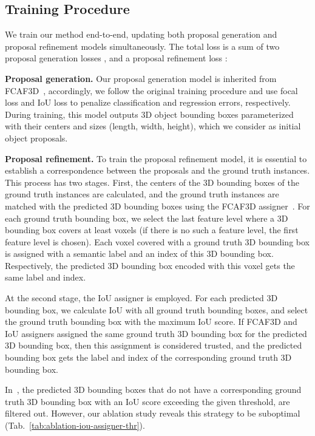 \documentclass[10pt,twocolumn,letterpaper]{article}
\newcommand\inline{\noindent\textbf}
\begin{document}
\subsection{Training Procedure}
\label{ssec:training-procedure}

We train our method end-to-end, updating both proposal generation and proposal refinement models simultaneously. The total loss is a sum of two proposal generation losses ,  and a proposal refinement loss : 

\inline{Proposal generation.} Our proposal generation model is inherited from FCAF3D~\cite{rukhovich2022fcaf3d}, accordingly, we follow the original training procedure and use focal loss  and IoU loss  to penalize classification and regression errors, respectively. During training, this model outputs 3D object bounding boxes parameterized with their centers and sizes (length, width, height), which we consider as initial object proposals.

\inline{Proposal refinement.} 
To train the proposal refinement model, it is essential to establish a correspondence between the proposals and the ground truth instances. This process has two stages. First, the centers of the 3D bounding boxes of the ground truth instances are calculated, and the ground truth instances are matched with the predicted 3D bounding boxes using the FCAF3D assigner~\cite{rukhovich2022fcaf3d}. For each ground truth bounding box, we select the last feature level where a 3D bounding box covers at least  voxels (if there is no such a feature level, the first feature level is chosen). Each voxel covered with a ground truth 3D bounding box is assigned with a semantic label and an index of this 3D bounding box. Respectively, the predicted 3D bounding box encoded with this voxel gets the same label and index.

At the second stage, the IoU assigner is employed. For each predicted 3D bounding box, we calculate IoU with all ground truth bounding boxes, and select the ground truth bounding box with the maximum IoU score. If FCAF3D and IoU assigners assigned the same ground truth 3D bounding box for the predicted 3D bounding box, then this assignment is considered trusted, and the predicted bounding box gets the label and index of the corresponding ground truth 3D bounding box. 

In~\cite{he2017mask}, the predicted 3D bounding boxes that do not have a corresponding ground truth 3D bounding box with an IoU score exceeding the given threshold, are filtered out. 
However, our ablation study reveals this strategy to be suboptimal (Tab.~\ref{tab:ablation-iou-assigner-thr}).
\end{document}

